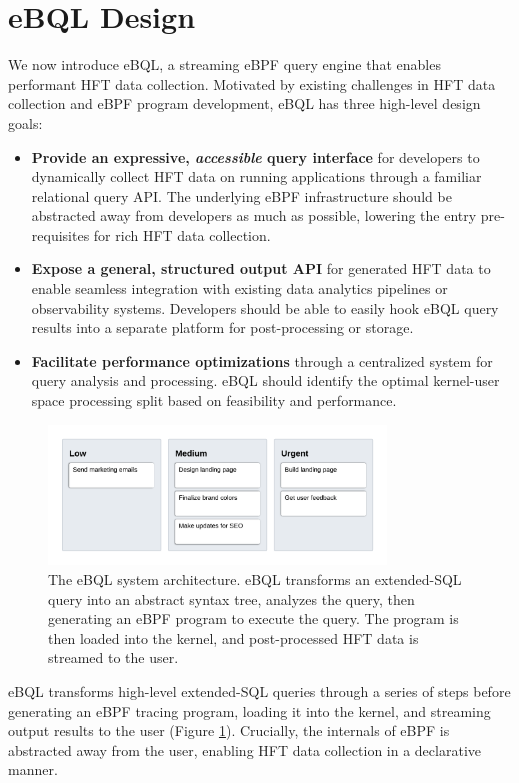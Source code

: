\section{eBQL Design}

We now introduce eBQL, a streaming eBPF query engine that enables performant HFT data collection.
Motivated by existing challenges in HFT data collection and eBPF program development, eBQL has three
high-level design goals:
\begin{itemize}
    \item \textbf{Provide an expressive, \textit{accessible} query interface} for developers to
        dynamically collect HFT data on running applications through a familiar relational query
        API. The underlying eBPF infrastructure should be abstracted away from developers as much as
        possible, lowering the entry pre-requisites for rich HFT data collection.
    \item \textbf{Expose a general, structured output API} for generated HFT data to enable seamless
        integration with existing data analytics pipelines or observability systems. Developers
        should be able to easily hook eBQL query results into a separate platform for
        post-processing or storage.
    \item \textbf{Facilitate performance optimizations} through a centralized system for query
        analysis and processing. eBQL should identify the optimal kernel-user space processing
        split based on feasibility and performance.
\end{itemize}

\begin{figure}[htpb]
    \centering
    \includegraphics[width=0.8\textwidth]{diagrams/ebql-architecture.png}
    \caption{The eBQL system architecture. eBQL transforms an extended-SQL query into an abstract
    syntax tree, analyzes the query, then generating an eBPF program to execute the query. The
    program is then loaded into the kernel, and post-processed HFT data is streamed to the user.}
    \label{fig:ebql-architecture}
\end{figure}
eBQL transforms high-level extended-SQL queries through a series of steps before generating an eBPF
tracing program, loading it into the kernel, and streaming output results to the user (Figure
\ref{fig:ebql-architecture}). Crucially, the internals of eBPF is abstracted away from the user,
enabling HFT data collection in a declarative manner.

